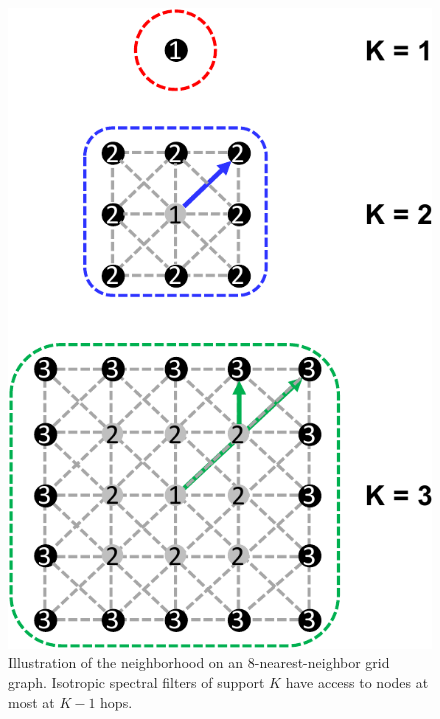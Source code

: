 \documentclass{article}
\newcommand{\todo}[1]{{\color{red} #1 }}
\begin{document}
\begin{figure}[t]
\begin{minipage}[t]{0.37\linewidth}
		\includegraphics[width=\linewidth]{gcnn_grid}
		\caption{Illustration of the neighborhood on an 8-nearest-neighbor grid graph. Isotropic spectral filters of support $K$ have access to nodes at most at $K-1$ hops.}
		\label{fig:reach}
	\end{minipage}
\end{figure}


\end{document}
